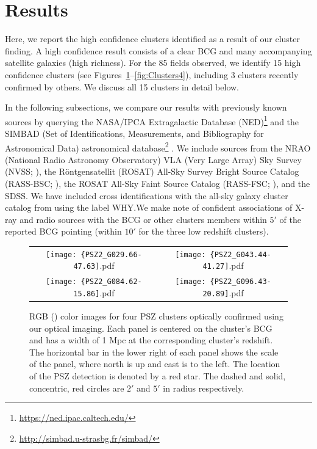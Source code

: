 \documentclass[apj, revtex4-1]{emulateapj}
\begin{document}
\section{Results}\label{sec:results}
Here, we report the high confidence clusters identified as a result of our cluster finding. A high confidence result consists of a clear BCG and many accompanying satellite galaxies (high richness). For the 85 fields observed, we identify 15 high confidence clusters (see Figures~\ref{fig:Clusters1}--\ref{fig:Clusters4}), including 3 clusters recently confirmed by others. We discuss all 15 clusters in detail below.

In the following subsections, we compare our results with previously known sources by querying the NASA/IPCA Extragalactic Database (NED)\footnote{\url{https://ned.ipac.caltech.edu/}} and the SIMBAD (Set of Identifications, Measurements, and Bibliography for Astronomical Data) astronomical database\footnote{\url{http://simbad.u-strasbg.fr/simbad/}} \citep{Wenger2000}. We include sources from the NRAO (National Radio Astronomy Observatory) VLA (Very Large Array) Sky Survey (NVSS; \citealt{Condon1998}), the R\"{o}ntgensatellit (ROSAT) All-Sky Survey Bright Source Catalog (RASS-BSC; \citealt{Voges1999a}), the ROSAT All-Sky Faint Source Catalog (RASS-FSC; \citealt{Voges2000}), and the SDSS. We have included cross identifications with the all-sky galaxy cluster catalog from \citet{Wen2018} using the label WHY.We make note of confident associations of X-ray and radio sources with the BCG or other clusters members within $5'$ of the reported BCG pointing (within $10'$ for the three low redshift clusters).

\begin{figure}
	\centering
	\begin{tabular}{cc}
		\texttt{[image: \{PSZ2\_G029.66-47.63]}.pdf}&
		\texttt{[image: \{PSZ2\_G043.44-41.27]}.pdf}\\
		\texttt{[image: \{PSZ2\_G084.62-15.86]}.pdf}&
		\texttt{[image: \{PSZ2\_G096.43-20.89]}.pdf}
	\end{tabular}
	\caption{RGB (\sdssi\sdssr\sdssg) color images for four PSZ clusters optically confirmed using our optical imaging. Each panel is centered on the cluster's BCG and has a width of 1 Mpc at the corresponding cluster's redshift. The horizontal bar in the lower right of each panel shows the scale of the panel, where north is up and east is to the left. The location of the PSZ detection is denoted by a red star. The dashed and solid, concentric, red circles are $2'$ and $5'$ in radius respectively.}
	\label{fig:Clusters1}
\end{figure}
\end{document}
